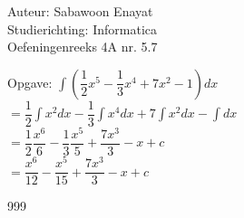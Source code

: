 \documentclass[a4paper]{article}
\begin{document}
  
\noindent \large Auteur: Sabawoon Enayat \\
\noindent \large Studierichting: Informatica\\
\noindent \large Oefeningenreeks 4A nr. 5.7 \\

\newcommand{\dint}{\displaystyle\int}

\medskip

\normalsize

Opgave: $\dint \left(\dfrac{1}{2}x^5 - \dfrac{1}{3}x^4 + 7x^2 - 1\right) dx$\\

$= \dfrac{1}{2}\dint x^2 dx - \dfrac{1}{3}\dint x^4 dx + 7\dint x^2 dx - \dint dx$\\

$= \dfrac{1}{2}\dfrac{x^6}{6} - \dfrac{1}{3}\dfrac{x^5}{5} + \dfrac{7x^3}{3} - x + c$\\

$= \dfrac{x^6}{12} - \dfrac{x^5}{15} + \dfrac{7x^3}{3} - x + c$\\

\begin{thebibliography}{999}
\end{thebibliography}
\end{document}
